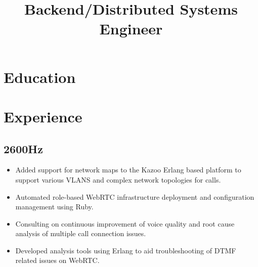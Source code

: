 \documentclass[11pt,a4paper,sans]{moderncv}   %
\title{Backend/Distributed Systems Engineer}                          %
\begin{document}
\makecvtitle

\section{Education}

\section{Experience}
\subsection{2600Hz}
  \begin{itemize}
  \item Added support for network maps to the Kazoo Erlang based platform to support various VLANS and complex network topologies for calls.
  \item Automated role-based WebRTC infrastructure deployment and configuration management using Ruby. 
  \item Consulting on continuous improvement of voice quality and root cause analysis of multiple call connection issues.
  \item Developed analysis tools using Erlang to aid troubleshooting of DTMF related issues on WebRTC.
  \end{itemize}
\end{document}
